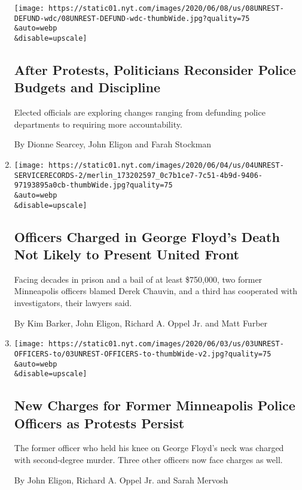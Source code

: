 \begin{enumerate}
  \texttt{[image: https://static01.nyt.com/images/2020/06/08/us/08UNREST-DEFUND-wdc/08UNREST-DEFUND-wdc-thumbWide.jpg?quality=75\\\&auto=webp\\\&disable=upscale]}

  \hypertarget{after-protests-politicians-reconsider-police-budgets-and-discipline}{%
  \subsection{After Protests, Politicians Reconsider Police Budgets and
  Discipline}\label{after-protests-politicians-reconsider-police-budgets-and-discipline}}

  Elected officials are exploring changes ranging from defunding police
  departments to requiring more accountability.

  By Dionne Searcey, John Eligon and Farah Stockman
\item
  \href{/2020/06/04/us/george-floyd-police-records-chauvin.html}{}

  \texttt{[image: https://static01.nyt.com/images/2020/06/04/us/04UNREST-SERVICERECORDS-2/merlin\_173202597\_0c7b1ce7-7c51-4b9d-9406-97193895a0cb-thumbWide.jpg?quality=75\\\&auto=webp\\\&disable=upscale]}

  \hypertarget{officers-charged-in-george-floyds-death-not-likely-to-present-united-front}{%
  \subsection{Officers Charged in George Floyd's Death Not Likely to
  Present United
  Front}\label{officers-charged-in-george-floyds-death-not-likely-to-present-united-front}}

  Facing decades in prison and a bail of at least \$750,000, two former
  Minneapolis officers blamed Derek Chauvin, and a third has cooperated
  with investigators, their lawyers said.

  By Kim Barker, John Eligon, Richard A. Oppel Jr. and Matt Furber
\item
  \href{/2020/06/03/us/george-floyd-officers-charged.html}{}

  \texttt{[image: https://static01.nyt.com/images/2020/06/03/us/03UNREST-OFFICERS-to/03UNREST-OFFICERS-to-thumbWide-v2.jpg?quality=75\\\&auto=webp\\\&disable=upscale]}

  \hypertarget{new-charges-for-former-minneapolis-police-officers-as-protests-persist}{%
  \subsection{New Charges for Former Minneapolis Police Officers as
  Protests
  Persist}\label{new-charges-for-former-minneapolis-police-officers-as-protests-persist}}

  The former officer who held his knee on George Floyd's neck was
  charged with second-degree murder. Three other officers now face
  charges as well.

  By John Eligon, Richard A. Oppel Jr. and Sarah Mervosh
\end{enumerate}

